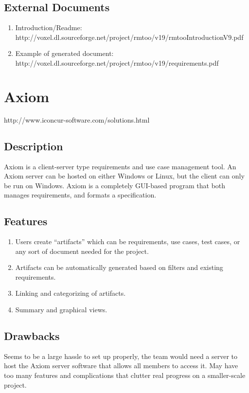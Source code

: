 \documentclass[12pt]{article}
\begin{document}
\subsection{External Documents}
\begin{enumerate}
\item Introduction/Readme: \\
  http://voxel.dl.sourceforge.net/project/rmtoo/v19/rmtooIntroductionV9.pdf
\item Example of generated document: \\
  http://voxel.dl.sourceforge.net/project/rmtoo/v19/requirements.pdf
\end{enumerate}


\section{Axiom}

http://www.iconcur-software.com/solutions.html

\subsection{Description}
Axiom is a client-server type requirements and use case management
tool. An Axiom server can be hosted on either Windows or Linux, but
the client can only be run on Windows. Axiom is a completely GUI-based
program that both manages requirements, and formats a specification.

\subsection{Features}
\begin{enumerate}
\item Users create ``artifacts'' which can be requirements, use cases,
  test cases, or any sort of document needed for the project.
\item Artifacts can be automatically generated based on filters and
  existing requirements.
\item Linking and categorizing of artifacts.
\item Summary and graphical views.
\end{enumerate}


\subsection{Drawbacks}
Seems to be a large hassle to set up properly, the team would need a
server to host the Axiom server software that allows all members to
access it. May have too many features and complications that clutter
real progress on a smaller-scale project.
\end{document}
